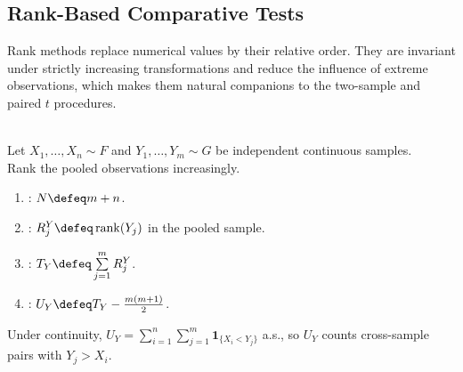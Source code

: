 \subsection{Rank-Based Comparative Tests}

Rank methods replace numerical values by their relative order.  They are invariant under strictly increasing transformations and reduce the influence of extreme observations, which makes them natural companions to the two-sample and paired $t$ procedures.

\begin{definition} \label{def:mann-whitney-rank-sum-statistics} \\
Let $X_1,\ldots,X_n\sim F$ and $Y_1,\ldots,Y_m\sim G$ be independent continuous samples.\\
Rank the pooled observations increasingly.
\begin{enumerate}[label=(\roman*)]
\setlength{\itemsep}{0pt}
\item {}: $N\defeq m+n$.
\item {}: $R_j^Y\defeq\operatorname{rank}(Y_j)$ in the pooled sample.
\item {}: $T_Y\defeq\sum\limits_{j=1}^mR_j^Y$.
\item {}: $U_Y\defeq T_Y-\frac{m(m+1)}{2}$.
\end{enumerate}
Under continuity, $U_Y=\sum\limits_{i=1}^n\sum\limits_{j=1}^m\mathbf{1}_{\{X_i<Y_j\}}$ a.s., so $U_Y$ counts cross-sample pairs with $Y_j>X_i$.
\end{definition}

